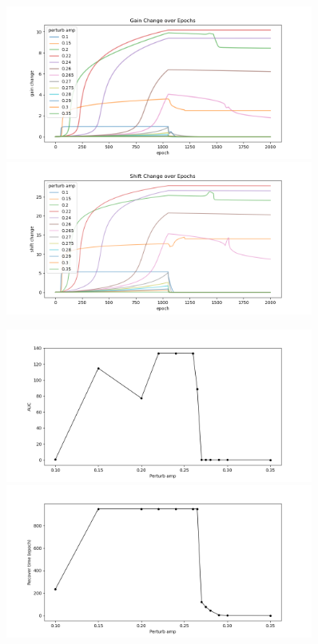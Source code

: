 \documentclass[12pt, a4paper]{article}
\begin{document}
\begin{figure}[H]
    \centering
    \includegraphics[width=0.9\textwidth]{FNN/fig/temp_abb05_perturbamp_gc_outsigmoid.png} \\
    \includegraphics[width=0.9\textwidth]{FNN/fig/temp_abb05_perturbamp_sc_outsigmoid.png} \\
\end{figure}


\begin{figure}[H]
    \centering
    \includegraphics[width=0.9\textwidth]{FNN/fig/temp_abb05_perturbamp_auc_outsigmoid.png} \\
    \includegraphics[width=0.9\textwidth]{FNN/fig/temp_abb05_perturbamp_rectime_outsigmoid.png} \\
\end{figure}
\end{document}
